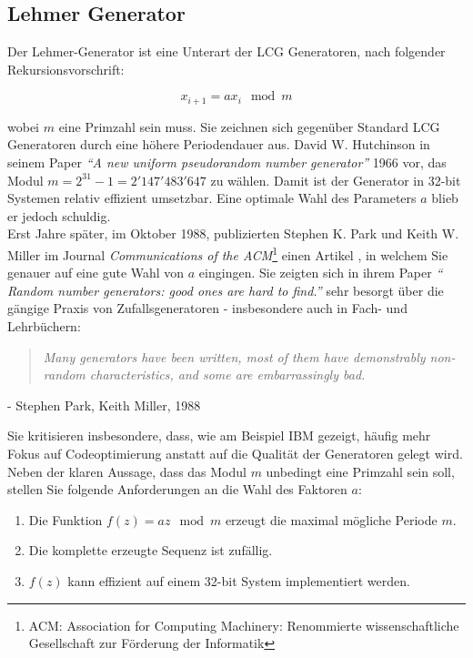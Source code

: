 \documentclass{book}
\begin{document}
\begin{refsection}
\newpage
\subsection{Lehmer Generator} \label{subsec:Lehmer}
Der Lehmer-Generator ist eine Unterart der LCG Generatoren, nach folgender Rekursionsvorschrift:

\begin{equation}
	x_{i+1} = a x_{i} \mod{m}
	\label{equ:lehmer}
\end{equation}

wobei $m$ eine Primzahl sein muss. Sie zeichnen sich gegenüber Standard LCG Generatoren durch eine höhere Periodendauer aus. David W. Hutchinson in seinem Paper \textit{``A new uniform pseudorandom number generator''} 1966 \cite{rng:Hutchinson1966} vor, das Modul  $m = 2^{31} - 1 = 2'147'483'647$ zu wählen. Damit ist der Generator in 32-bit Systemen relativ effizient umsetzbar. Eine optimale Wahl des Parameters $a$ blieb er jedoch schuldig. \\

Erst Jahre später, im Oktober 1988, publizierten Stephen K. Park und Keith W. Miller im Journal \textit{Communications of the ACM}\footnote{ACM: Association for Computing Machinery: Renommierte wissenschaftliche Gesellschaft zur Förderung der Informatik} einen Artikel \cite{rng:ParkMiller1988}, in welchem Sie genauer auf eine gute Wahl von $a$ eingingen. Sie zeigten sich in ihrem Paper \textit{`` Random number generators: good ones are hard to find.''} sehr besorgt über die gängige Praxis von Zufallsgeneratoren - insbesondere auch in Fach- und Lehrbüchern:

\begin{quote}
	\textit{Many generators have been written, most of them have demonstrably non-random characteristics, and some are embarrassingly bad.}
\end{quote}
\begin{flushright}
	- Stephen Park, Keith Miller, 1988 \cite{rng:ParkMiller1988}
\end{flushright}

Sie kritisieren insbesondere, dass, wie am Beispiel IBM gezeigt, häufig mehr Fokus auf Codeoptimierung anstatt auf die Qualität der Generatoren gelegt wird. Neben der klaren Aussage, dass das Modul $m$ unbedingt eine Primzahl sein soll, stellen Sie folgende Anforderungen an die Wahl des Faktoren $a$:

\begin{enumerate}
	\item Die Funktion $f(z) = a z \mod m$ erzeugt die maximal mögliche Periode $m$.
	\item Die komplette erzeugte Sequenz ist zufällig.
	\item $f(z)$ kann effizient auf einem 32-bit System implementiert werden.
\end{enumerate}


\end{refsection}
\end{document}

